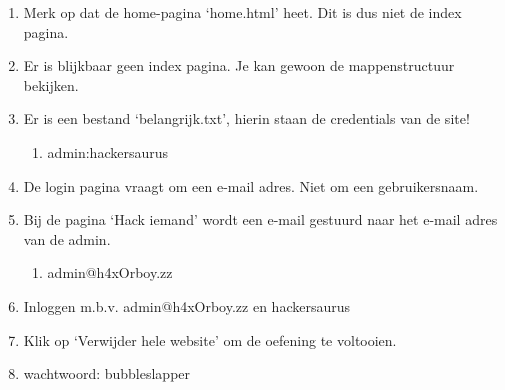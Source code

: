 \begin{enumerate}
  \item Merk op dat de home-pagina `home.html' heet. Dit is dus niet de index pagina.
  \item Er is blijkbaar geen index pagina. Je kan gewoon de mappenstructuur bekijken.
  \item Er is een bestand `belangrijk.txt', hierin staan de credentials van de site!
	\begin{enumerate}
	\item admin:hackersaurus
	\end{enumerate}
  \item De login pagina vraagt om een e-mail adres. Niet om een gebruikersnaam.
  \item Bij de pagina `Hack iemand' wordt een e-mail gestuurd naar het e-mail adres van de admin.
  	\begin{enumerate}
	\item admin@h4xOrboy.zz
	\end{enumerate}
  \item Inloggen m.b.v. admin@h4xOrboy.zz en hackersaurus
  \item Klik op `Verwijder hele website' om de oefening te voltooien.
  \item wachtwoord: bubbleslapper
\end{enumerate}